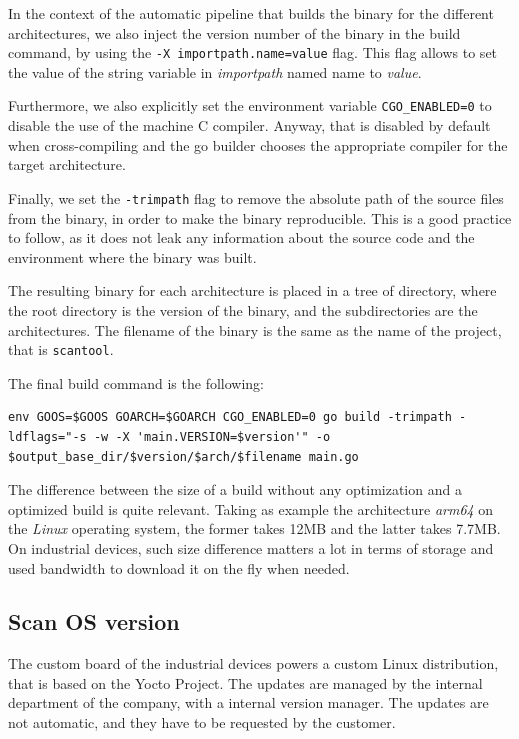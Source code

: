 In the context of the automatic pipeline that builds the binary for the different architectures, we also inject the version number of the binary in the build command, by using the \texttt{-X importpath.name=value} flag. This flag allows to set the value of the string variable in \textit{importpath} named name to \textit{value}.~\cite{go-ldflags-all}

Furthermore, we also explicitly set the environment variable \texttt{CGO\_ENABLED=0} to disable the use of the machine C compiler. Anyway, that is disabled by default when cross-compiling and the go builder chooses the appropriate compiler for the target architecture.~\cite{go-cgo-compiler}

Finally, we set the \texttt{-trimpath} flag to remove the absolute path of the source files from the binary, in order to make the binary reproducible. This is a good practice to follow, as it does not leak any information about the source code and the environment where the binary was built.~\cite{go-trimpath-arg}

The resulting binary for each architecture is placed in a tree of directory, where the root directory is the version of the binary, and the subdirectories are the architectures. The filename of the binary is the same as the name of the project, that is \texttt{scantool}.

The final build command is the following:
\begin{lstlisting}[caption={Go tool cross-build command}]
  env GOOS=$GOOS GOARCH=$GOARCH CGO_ENABLED=0 go build -trimpath -ldflags="-s -w -X 'main.VERSION=$version'" -o $output_base_dir/$version/$arch/$filename main.go
\end{lstlisting}

The difference between the size of a build without any optimization and a optimized build is quite relevant. Taking as example the architecture \textit{arm64} on the \textit{Linux} operating system, the former takes 12MB and the latter takes 7.7MB. On industrial devices, such size difference matters a lot in terms of storage and used bandwidth to download it on the fly when needed.

\subsection{Scan OS version}

The custom board of the industrial devices powers a custom Linux distribution, that is based on the Yocto Project. The updates are managed by the internal department of the company, with a internal version manager. The updates are not automatic, and they have to be requested by the customer.

